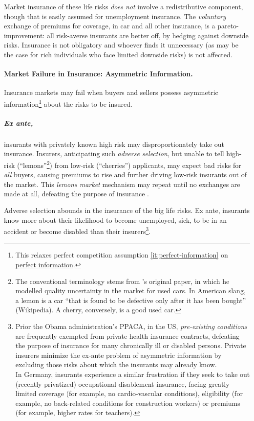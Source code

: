 Market insurance of these life risks \emph{does not} involve a redistributive component, though that is easily assumed for unemployment insurance. The \emph{voluntary} exchange of premiums for coverage, in car and all other insurance, is a pareto-improvement: all risk-averse insurants are better off, by hedging against downside risks. Insurance is not obligatory and whoever finds it unnecessary (as may be the case for rich individuals who face limited downside risks) is not affected.

\paragraph{Market Failure in Insurance: Asymmetric Information.}
\label{sec:asymmetric-information}

Insurance markets may fail when buyers and sellers possess asymmetric information\footnote{
	This relaxes perfect competition assumption \ref{it:perfect-information} on \hyperref[it:perfect-information]{perfect information}.}
about the risks to be insured.

\subparagraph[Adverse Selection]{Ex ante,} \label{sec:adverse-selection} insurants with privately known high risk may disproportionately take out insurance. Insurers, anticipating such \emph{adverse selection}, but unable to tell high-risk (``lemons''\footnote{
	The conventional terminology stems from \citeauthor{Akerlof-1970-aa}'s original paper, in which he modelled  quality uncertainty in the market for used cars. In American slang, a lemon is a car ``that is found to be defective only after it has been bought'' (Wikipedia). A cherry, conversely, is a good used car.})
from low-risk (``cherries'') applicants,  may expect bad risks for \emph{all} buyers, causing premiums to rise and further driving low-risk insurants out of the market. This \emph{lemons market} mechanism may repeat until no exchanges are made at all, defeating the purpose of insurance \citep{Akerlof-1970-aa}.

Adverse selection abounds in the insurance of the big life risks. Ex ante, insurants know more about their likelihood to become unemployed, sick, to be in an accident or become disabled than their insurers\footnote{
	Prior the Obama administration's \gls{PPACA}, in the US, \emph{pre-existing conditions} are frequently exempted from private health insurance contracts, defeating the purpose of insurance for many chronically ill or disabled persons. Private insurers minimize the ex-ante problem of asymmetric information by excluding those risks about which the insurants may already know.\\
	In Germany, insurants experience a similar frustration if they seek to take out (recently privatized) occupational disablement insurance, facing greatly limited coverage (for example, no cardio-vascular conditions), eligibility (for example, no back-related conditions for construction workers) or premiums (for example, higher rates for teachers).}.

